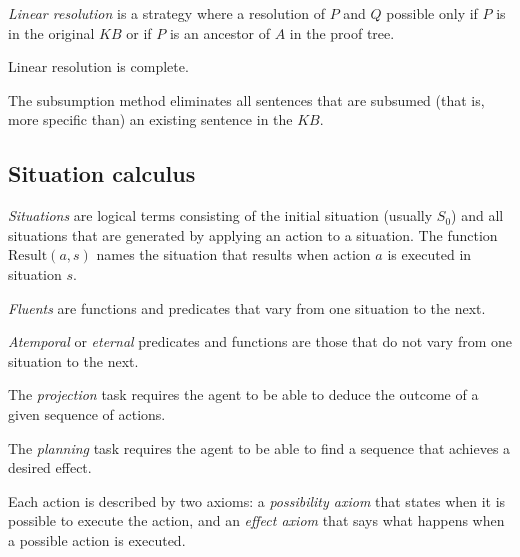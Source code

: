 \documentclass{article}
\begin{document}
\begin{definition}
    \emph{Linear resolution} is a strategy where a resolution of $P$ and $Q$
    possible only if $P$ is in the original $KB$ or if $P$ is an ancestor
    of $A$ in the proof tree.
\end{definition}

\begin{theorem}
    Linear resolution is complete.
\end{theorem}

\begin{definition}
    The subsumption method eliminates all sentences that are subsumed
    (that is, more specific than) an existing sentence in the $KB$.
\end{definition}

\subsection{Situation calculus}

\begin{definition}
    \emph{Situations} are logical terms consisting of the initial
    situation (usually $S_0$) and all situations that are generated
    by applying an action to a situation. The function $\text{Result}
    (a,s)$ names the situation that results when action $a$ is executed
    in situation $s$.
\end{definition}

\begin{definition}
    \emph{Fluents} are functions and predicates that vary from one
    situation to the next.
\end{definition}

\begin{definition}
    \emph{Atemporal} or \emph{eternal} predicates and functions
    are those that do not vary from one situation to the next.
\end{definition}

\begin{definition}
    The \emph{projection} task requires the agent to be able to deduce
    the outcome of a given sequence of actions.
\end{definition}

\begin{definition}
    The \emph{planning} task requires the agent to be able to find a
    sequence that achieves a desired effect.
\end{definition}

\begin{definition}
    Each action is described by two axioms: a \emph{possibility axiom}
    that states when it is possible to execute the action, and an
    \emph{effect axiom} that says what happens when a possible action
    is executed.
\end{definition}
\end{document}
